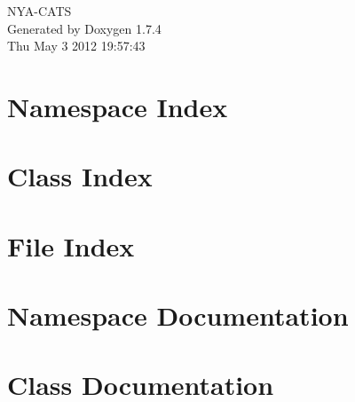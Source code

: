 \documentclass[a4paper]{book}
\begin{document}
\hypersetup{pageanchor=false}
\begin{titlepage}
\vspace*{7cm}
\begin{center}
{\Large NYA-\/CATS }\\
\vspace*{1cm}
{\large Generated by Doxygen 1.7.4}\\
\vspace*{0.5cm}
{\small Thu May 3 2012 19:57:43}\\
\end{center}
\end{titlepage}
\clearemptydoublepage
{}
\tableofcontents
\clearemptydoublepage
{}
\hypersetup{pageanchor=true}
\chapter{Namespace Index}

\chapter{Class Index}

\chapter{File Index}

\chapter{Namespace Documentation}


\chapter{Class Documentation}























































\end{document}
